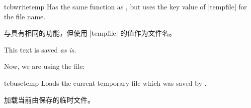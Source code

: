 \begin{docEnvironment}{tcbwritetemp}{}
Has the same function as , but uses the key value
of |tempfile| for the file name.

与具有相同的功能，但使用 |tempfile| 的值作为文件名。

\begin{dispExample}
\begin{tcbwritetemp}
  This text is saved \textit{as is}.
\end{tcbwritetemp}

Now, we are using the file:\par
\tcbusetemp
\end{dispExample}
\end{docEnvironment}


\begin{docCommand}{tcbusetemp}{}
Loads the current temporary file which was saved by .

加载当前由保存的临时文件。
\end{docCommand}



